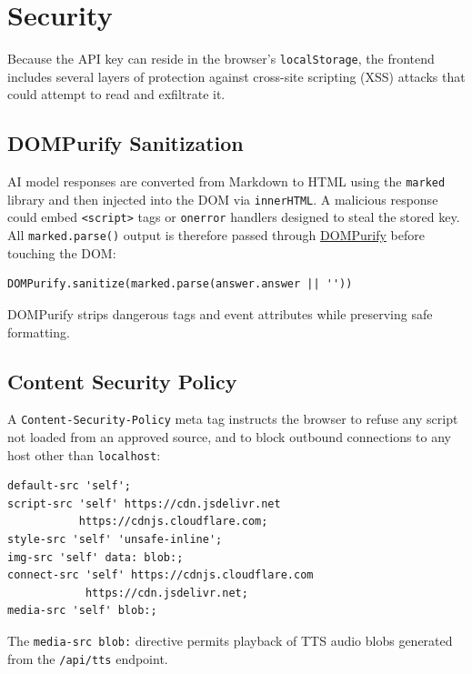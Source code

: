 \documentclass[11pt]{article}
\begin{document}
\section{Security}

Because the API key can reside in the browser's \texttt{localStorage}, the
frontend includes several layers of protection against cross-site scripting
(XSS) attacks that could attempt to read and exfiltrate it.

\subsection{DOMPurify Sanitization}

AI model responses are converted from Markdown to HTML using the
\texttt{marked} library and then injected into the DOM via
\texttt{innerHTML}. A malicious response could embed
\texttt{<script>} tags or \texttt{onerror} handlers designed to steal the
stored key. All \texttt{marked.parse()} output is therefore passed through
\href{https://github.com/cure53/DOMPurify}{DOMPurify} before touching the
DOM:

\begin{Verbatim}[fontsize=\small]
DOMPurify.sanitize(marked.parse(answer.answer || ''))
\end{Verbatim}

DOMPurify strips dangerous tags and event attributes while preserving safe
formatting.

\subsection{Content Security Policy}

A \texttt{Content-Security-Policy} meta tag instructs the browser to
refuse any script not loaded from an approved source, and to block
outbound connections to any host other than \texttt{localhost}:

\begin{Verbatim}[fontsize=\small]
default-src 'self';
script-src 'self' https://cdn.jsdelivr.net
           https://cdnjs.cloudflare.com;
style-src 'self' 'unsafe-inline';
img-src 'self' data: blob:;
connect-src 'self' https://cdnjs.cloudflare.com
            https://cdn.jsdelivr.net;
media-src 'self' blob:;
\end{Verbatim}

The \texttt{media-src blob:} directive permits playback of TTS audio blobs
generated from the \texttt{/api/tts} endpoint.
\end{document}
